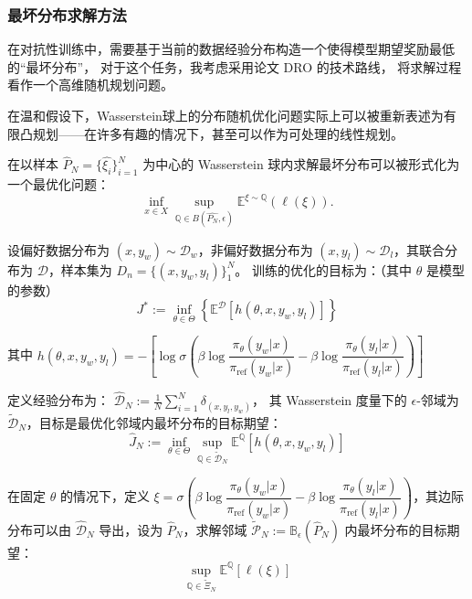 \subsubsection{最坏分布求解方法} \label{sec:bad-dis}

在对抗性训练中，需要基于当前的数据经验分布构造一个使得模型期望奖励最低的“最坏分布”，
对于这个任务，我考虑采用论文 DRO\citep{Esfahani2018Data} 的技术路线，
将求解过程看作一个高维随机规划问题。

在温和假设下，Wasserstein球上的分布随机优化问题实际上可以被重新表述为有限凸规划——在许多有趣的情况下，甚至可以作为可处理的线性规划。

在以样本 $\hat{P}_N = \{\hat{\xi_i}\}_{i=1}^N$ 为中心的 Wasserstein 球内求解最坏分布可以被形式化为一个最优化问题：
\begin{equation}
    \inf_{x\in X}\sup_{\mathbb{Q}\in B(\hat{P_N}, \epsilon)} \mathbb{E^{\xi\sim Q}}(\ell(\xi)).
\end{equation}

设偏好数据分布为 $(x, y_w) \sim \mathcal{D}_w$，非偏好数据分布为 $(x, y_l) \sim \mathcal{D}_l$，其联合分布为 $\mathcal{D}$，样本集为 $D_n = \{(x, y_w, y_l)\}_1^N$。
训练的优化的目标为：（其中 $\theta$ 是模型的参数）
\begin{equation}
    J^* := \inf_{\theta \in \Theta} \left\{ \mathbb{E}^{\mathcal{D}} [h(\theta, x,y_w,y_l)]\right\}
\end{equation}

其中 $h(\theta, x, y_w, y_l) = - \left[ \log \sigma \left( \beta \log \dfrac{\pi_{\theta}(y_w | x)}{\pi_{\text{ref}} (y_w |x)} -  \beta \log \dfrac{\pi_{\theta}(y_l | x)}{\pi_{\text{ref}} (y_l |x)} \right)\right]$  

定义经验分布为： $\hat{\mathcal{D}}_N := \frac1N \sum_{i=1}^N \delta_{(x, y_l, y_w)}$，
其 Wasserstein 度量下的 $\epsilon$-邻域为 $\tilde{\mathcal{D}}_N$，目标是最优化邻域内最坏分布的目标期望：
\begin{equation}
    \hat{J}_N := \inf_{\theta \in \Theta} \sup_{\mathbb{Q} \in \tilde{\mathcal{D}}_N} \mathbb{E}^{\mathbb{Q}} [h(\theta, x, y_w ,y_l)]
\end{equation}

在固定 $\theta$ 的情况下，定义 $\xi = \sigma \left( \beta \log \dfrac{\pi_{\theta}(y_w | x)}{\pi_{\text{ref}} (y_w |x)} -  \beta \log \dfrac{\pi_{\theta}(y_l | x)}{\pi_{\text{ref}} (y_l |x)} \right)$，其边际分布可以由 $\hat{\mathcal{D}}_N$ 导出，设为 $\hat{P}_N$，求解邻域 $\tilde{\mathcal{P}}_N := \mathbb{B}_{\epsilon}(\hat{P}_N)$  内最坏分布的目标期望：
\begin{equation}
    \sup_{\mathbb{Q} \in \tilde{\mathcal{\Xi}}_N} \mathbb{E}^{\mathbb{Q}} [\ell (\xi)]
\end{equation}

